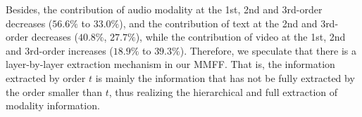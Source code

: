 \documentclass{article}
\begin{document}
Besides, the contribution of audio modality at the 1st, 2nd and 3rd-order decreases ($56.6\%$ to $33.0\%$), and the contribution of text at the 2nd and 3rd-order decreases ($40.8\%$, $27.7\%$), while the contribution of video at the 1st, 2nd and 3rd-order increases ($18.9\%$ to $39.3\%$). Therefore, we speculate that there is a layer-by-layer extraction mechanism in our MMFF. That is, the information extracted by order $t$ is mainly the information that has not be fully extracted by the order smaller than $t$, thus realizing the hierarchical and full extraction of modality information. 

\begin{table}[!t]
   	\centering
   	\caption{Modality Contribution learned by our MMFF, where the largest contribution is marked in bold.}
   	\label{tab:contmodal}
\end{table}   	
   	

\end{document}
